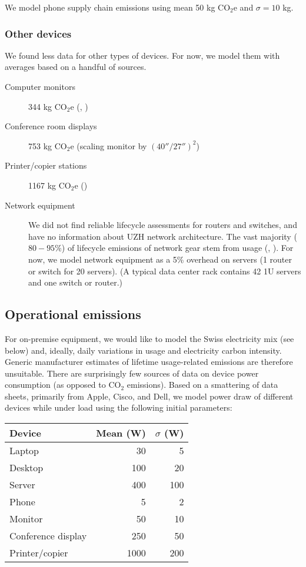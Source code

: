 \documentclass[11pt]{article}
\newcommand{\assumption}[1]{{#1}}
\begin{document}
\assumption{We model phone supply chain emissions using mean 50 kg CO$_2$e and $\sigma = 10$ kg.}

\subsubsection{Other devices}

We found less data for other types of devices. For now, we model them with averages based
on a handful of sources.

\begin{description}
    \item[Computer monitors] 344 kg CO$_2$e (\textcite{teehan2013}, \textcite{dellpcf})
    \item[Conference room displays] 753 kg CO$_2$e (scaling monitor by $(40''/27'')^2$)
    \item[Printer/copier stations] 1167 kg CO$_2$e (\textcite{ecoinvent})
    \item[Network equipment] We did not find reliable lifecycle assessments for routers and switches,
      and have no information about UZH network architecture. The vast majority ($80-95\%$) of
      lifecycle emissions of network gear stem from usage (\textcite{cisco2024}, \textcite{jacob2023}).
      For now, we model network equipment as a 5\% overhead on servers (1 router or switch for 20 servers).
      (A typical data center rack contains 42 1U servers and one switch or router.)
\end{description}

\subsection{Operational emissions}

For on-premise equipment, we would like to model the Swiss electricity mix (see below) and, ideally,
daily variations in usage and electricity carbon intensity.
Generic manufacturer estimates of lifetime usage-related emissions are therefore unsuitable.
There are surprisingly few sources of data on device power consumption (as opposed to CO$_2$ emissions).
Based on a smattering of data sheets, primarily from Apple, Cisco, and Dell, we model
power draw of different devices while under load using the following initial parameters:

\begin{center}
\begin{tabular}{|l|r|r|}
\hline
\textbf{Device} & \textbf{Mean (W)} & \textbf{$\sigma$ (W)} \\ \hline
Laptop & 30 & 5 \\ \hline
Desktop & 100 & 20 \\ \hline
Server & 400 & 100 \\ \hline
Phone & 5 & 2 \\ \hline
Monitor & 50 & 10 \\ \hline
Conference display & 250 & 50 \\ \hline
Printer/copier & 1000 & 200 \\ \hline
\end{tabular}
\end{center}
\end{document}
